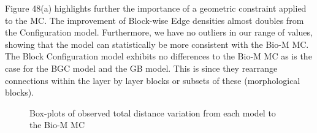 Figure 48(a) highlights further the importance of a geometric constraint applied to the MC. The improvement of Block-wise Edge densities almost doubles from the Configuration model. Furthermore, we have no outliers in our range of values, showing that the model can statistically be more consistent with the Bio-M MC. The Block Configuration model exhibits no differences to the Bio-M MC as is the case for the BGC model and the GB model. This is since they rearrange connections within the layer by layer blocks or subsets of these (morphological blocks). 
\begin{figure}[H]%
    \centering
    \captionsetup{justification=centering}
    \qquad
    \caption{Box-plots of observed total distance variation from each model to the Bio-M MC}%
    \label{fig:example}%
\end{figure}


